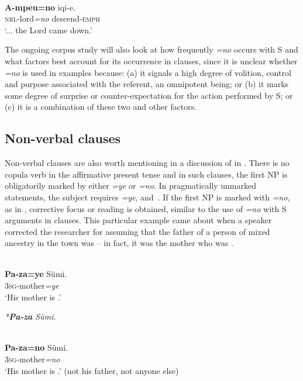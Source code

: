\documentclass[output=paper]{LSP/langsci}
\begin{document}
\ea\label{13-te-ex:25}
\\
 \textbf{ A-mpeu=no} iqi-e.\\
{} \textsc{nrl}-lord\textit{=no} descend-\textsc{emph}\\
\glt ‘... the Lord came down.’
\z

The ongoing corpus study will also look at how frequently \textit{=no} occurs with S and what factors best account for its occurrence in  clauses, since it is unclear whether \textit{=no} is used in examples  because: (a) it signals a high degree of volition, control and purpose associated with the referent, \ie an omnipotent being; or (b) it marks some degree of surprise or counter-expectation for the action performed by S; or (c) it is a combination of these two and other factors.

\subsection{Non-verbal clauses} \label{13-te-sec:3.3}

Non-verbal clauses are also worth mentioning in a discussion of  in . 
There is no copula verb in the affirmative present tense and in such clauses, the first NP is obligatorily marked by either \textit{=ye} or \textit{=no}. In pragmatically unmarked statements, the subject requires \textit{=ye}, \cf {} and~. 
If the first NP is marked with \textit{=no}, as in , corrective focus or  reading  is obtained, similar to the use of \textit{=no} with S arguments in  clauses. 
This particular example came about when a speaker corrected the researcher for assuming that the father of a person of mixed ancestry in the town was  – in fact, it was the mother who was .

\ea\label{13-te-ex:26}
\\
\gll  \textbf{Pa-za=ye} Sümi.\\
3\textsc{sg}-mother\textit{=ye} \\
\glt ‘His mother is .’ %
\z

\ea\label{13-te-ex:27}
 \textit{*}\textbf{\textit{Pa-za}} \textit{Sümi.}
\z

\ea\label{13-te-ex:28}
\\
\gll \textbf{Pa-za=no} Sümi.\\
3\textsc{sg}-mother\textit{=no} \\
\glt ‘His mother is .’ (\ie not his father, not anyone else)\z
\end{document}
